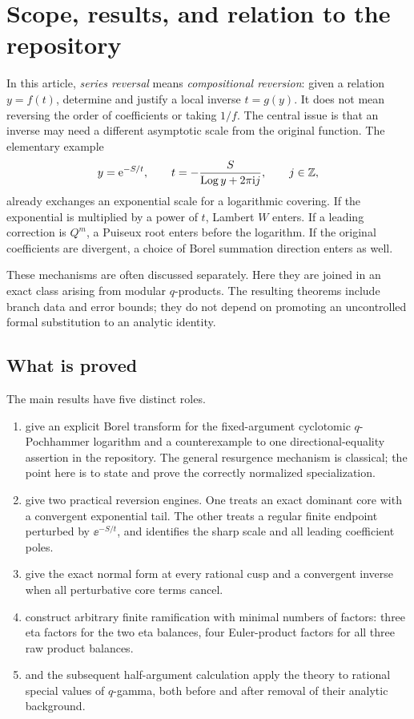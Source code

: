 \section{Scope, results, and relation to the repository}\label{sec:scope}

In this article, \emph{series reversal} means \emph{compositional reversion}:
given a relation \(y=f(t)\), determine and justify a local inverse \(t=g(y)\).
It does not mean reversing the order of coefficients or taking \(1/f\).
The central issue is that an inverse may need a different asymptotic scale
from the original function.  The elementary example
\[
 y=\mathrm e^{-S/t},\qquad
 t=-\frac{S}{\operatorname{Log} y+2\pi\mathrm i j},\qquad j\in\mathbb Z,
\]
already exchanges an exponential scale for a logarithmic covering.
If the exponential is multiplied by a power of \(t\), Lambert \(W\)
enters.  If a leading correction is \(Q^m\), a Puiseux root enters before
the logarithm.  If the original coefficients are divergent, a choice of
Borel summation direction enters as well.

These mechanisms are often discussed separately.  Here they are joined in
an exact class arising from modular \(q\)-products.  The resulting theorems
include branch data and error bounds; they do not depend on promoting an
uncontrolled formal substitution to an analytic identity.

\subsection{What is proved}

The main results have five distinct roles.
\begin{enumerate}[leftmargin=*,itemsep=4pt]
\item {} give an
explicit Borel transform for the fixed-argument cyclotomic \(q\)-Pochhammer
logarithm and a counterexample to one directional-equality assertion in
the repository.  The general resurgence mechanism is classical; the
point here is to state and prove the correctly normalized specialization.
\item {} give two practical
reversion engines.  One treats an exact dominant core with a convergent
exponential tail.  The other treats a regular finite endpoint perturbed by
\(\ee^{-S/t}\), and identifies the sharp scale and all leading coefficient
poles.
\item {} give the exact
normal form at every rational cusp and a convergent inverse when all
perturbative core terms cancel.
\item {} construct arbitrary
finite ramification with minimal numbers of factors: three eta factors
for the two eta balances, four Euler-product factors for all three raw
product balances.
\item {} and the subsequent half-argument
calculation apply the theory to rational special values of \(q\)-gamma,
both before and after removal of their analytic background.
\end{enumerate}

